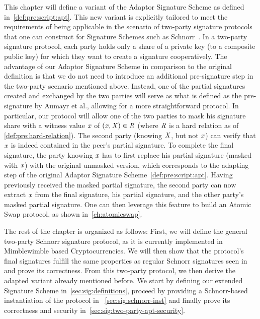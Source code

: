 This chapter will define a variant of the Adaptor Signature Scheme as defined in~\cref{def:pre:script:apt}.
This new variant is explicitly tailored to meet the requirements of being applicable in the scenario of two-party signature protocols that one can construct for Signature Schemes such as Schnorr~\cite{maxwell2019simple}.
In a two-party signature protocol, each party holds only a share of a private key (to a composite public key) for which they want to create a signature cooperatively.
The advantage of our Adaptor Signature Scheme in comparison to the original definition is that we do not need to introduce an additional pre-signature step in the two-party scenario mentioned above.
Instead, one of the partial signatures created and exchanged by the two parties will serve as what is defined as the pre-signature by Aumayr et al., allowing for a more straightforward protocol.
In particular, our protocol will allow one of the two parties to mask his signature share with a witness value $\mathit{x}$ of $(\mathit{x}, \mathit{X}) \in \mathit{R}$ (where $\mathit{R}$ is a hard relation as of \cref{def:pre:hard-relation}).
The second party (knowing $\mathit{X}$, but not $\mathit{x}$) can verify that $\mathit{x}$ is indeed contained in the peer's partial signature.
To complete the final signature, the party knowing $\mathit{x}$ has to first replace his partial signature (masked with $\mathit{x}$) with the original unmasked version, which corresponds to the adapting step of the original Adaptor Signature Scheme~\cref{def:pre:script:apt}.
Having previously received the masked partial signature, the second party can now extract $\mathit{x}$ from the final signature, his partial signature, and the other party's masked partial signature.
One can then leverage this feature to build an Atomic Swap protocol, as shown in~\cref{ch:atomicswap}.

The rest of the chapter is organized as follows:
First, we will define the general two-party Schnorr signature protocol, as it is currently implemented in Mimblewimble based Cryptocurrencies.
We will then show that the protocol's final signatures fulfill the same properties as regular Schnorr signatures seen in~\cite{schnorr1989efficient} and prove its correctness.
From this two-party protocol, we then derive the adapted variant already mentioned before.
We start by defining our extended Signature Scheme in~\cref{sec:sig:definitions}, proceed by providing a Schnorr-based instantiation of the protocol in ~\cref{sec:sig:schnorr-inst} and finally prove its correctness and security in~\cref{sec:sig:two-party-apt-security}.

